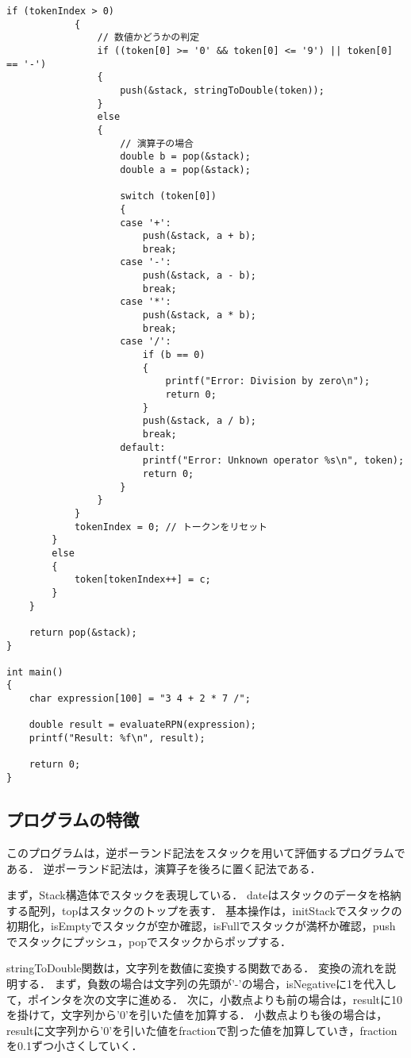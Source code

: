 \documentclass{ltjsarticle}
\begin{document}
\begin{lstlisting}[frame=single, lineskip=-5pt]
            if (tokenIndex > 0)
            {
                // 数値かどうかの判定
                if ((token[0] >= '0' && token[0] <= '9') || token[0] == '-')
                {
                    push(&stack, stringToDouble(token));
                }
                else
                {
                    // 演算子の場合
                    double b = pop(&stack);
                    double a = pop(&stack);

                    switch (token[0])
                    {
                    case '+':
                        push(&stack, a + b);
                        break;
                    case '-':
                        push(&stack, a - b);
                        break;
                    case '*':
                        push(&stack, a * b);
                        break;
                    case '/':
                        if (b == 0)
                        {
                            printf("Error: Division by zero\n");
                            return 0;
                        }
                        push(&stack, a / b);
                        break;
                    default:
                        printf("Error: Unknown operator %s\n", token);
                        return 0;
                    }
                }
            }
            tokenIndex = 0; // トークンをリセット
        }
        else
        {
            token[tokenIndex++] = c;
        }
    }

    return pop(&stack);
}

int main()
{
    char expression[100] = "3 4 + 2 * 7 /";

    double result = evaluateRPN(expression);
    printf("Result: %f\n", result);

    return 0;
}
\end{lstlisting}

\subsection{プログラムの特徴}
このプログラムは，逆ポーランド記法をスタックを用いて評価するプログラムである．
逆ポーランド記法は，演算子を後ろに置く記法である．

まず，Stack構造体でスタックを表現している．
dateはスタックのデータを格納する配列，topはスタックのトップを表す．
基本操作は，initStackでスタックの初期化，isEmptyでスタックが空か確認，isFullでスタックが満杯か確認，pushでスタックにプッシュ，popでスタックからポップする．

stringToDouble関数は，文字列を数値に変換する関数である．
変換の流れを説明する．
まず，負数の場合は文字列の先頭が'-'の場合，isNegativeに1を代入して，ポインタを次の文字に進める．
次に，小数点よりも前の場合は，resultに10を掛けて，文字列から'0'を引いた値を加算する．
小数点よりも後の場合は，resultに文字列から'0'を引いた値をfractionで割った値を加算していき，fractionを0.1ずつ小さくしていく．
\end{document}
